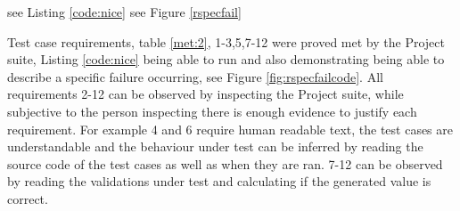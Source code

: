 \documentclass[a4paper,12pt]{article}
\begin{document}
see Listing \ref{code:nice} see Figure \ref{rspecfail}

\par Test case requirements, table \ref{met:2}, 1-3,5,7-12 were proved met by the Project suite, Listing \ref{code:nice} being able to run and also demonstrating being able to describe a specific failure occurring,  see Figure \ref{fig:rspecfailcode}. All requirements 2-12 can be observed by inspecting the Project suite, while subjective to the person inspecting there is enough evidence to justify each requirement. For example 4 and 6 require human readable text, the test cases are understandable and the behaviour under test can be inferred by reading the source code of the test cases as well as when they are ran. 7-12 can be observed by reading the validations under test and calculating if the generated value is correct.
\end{document}
